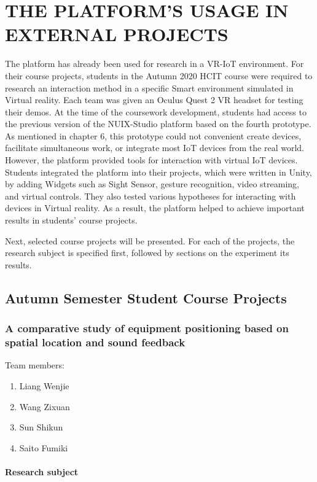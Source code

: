
\chapter{THE PLATFORM'S USAGE IN EXTERNAL PROJECTS}
The platform has already been used for research in a VR-IoT environment.
For their course projects, students in the Autumn 2020 HCIT course were required to research an interaction method in a specific Smart environment simulated in Virtual reality. Each team was given an Oculus Quest 2 VR headset for testing their demos. At the time of the coursework development, students had access to the previous version of the NUIX-Studio platform based on the fourth prototype. As mentioned in chapter 6, this prototype could not convenient create devices, facilitate simultaneous work, or integrate most IoT devices from the real world. However, the platform provided tools for interaction with virtual IoT devices. Students integrated the platform into their projects, which were written in Unity, by adding Widgets such as Sight Sensor, gesture recognition, video streaming, and virtual controls. They also tested various hypotheses for interacting with devices in Virtual reality. As a result, the platform helped to achieve important results in students' course projects. 

Next, selected course projects will be presented. For each of the projects, the research subject is specified first, followed by sections on the experiment its results.

\section{Autumn Semester Student Course Projects}

\subsection{A comparative study of equipment positioning based on spatial location and sound feedback}

Team members:
\begin{enumerate}
    \item Liang Wenjie
    \item Wang Zixuan
    \item Sun Shikun
    \item Saito Fumiki
\end{enumerate}

\subsubsection{Research subject}

